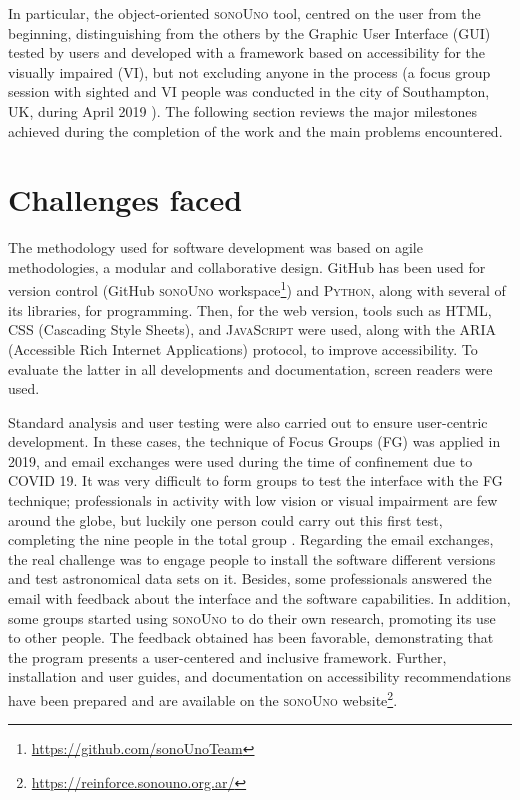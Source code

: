 \documentclass[baaa]{baaa}
\begin{document}
In particular, the object-oriented \textsc{sonoUno} tool, centred on the user from the beginning, distinguishing from the others by the Graphic User Interface (GUI) tested by users and developed with a framework based on accessibility for the visually impaired (VI), but not excluding anyone in the process (a focus group session with sighted and VI people was conducted in the city of Southampton, UK, during April 2019 \citep{casadoFG2022}). The following section reviews the major milestones achieved during the completion of the work and the main problems encountered.

\section{Challenges faced}

The methodology used for software development was based on agile methodologies, a modular and collaborative design. GitHub has been used for version control ({GitHub \textsc{sonoUno} workspace}\footnote[1]{\url{https://github.com/sonoUnoTeam}}) and \textsc{Python}, along with several of its libraries, for programming. Then, for the web version, tools such as \textsc{HTML}, \textsc{CSS} (Cascading Style Sheets), and \textsc{JavaScript} were used, along with the \textsc{ARIA} (Accessible Rich Internet Applications) protocol, to improve accessibility. To evaluate the latter in all developments and documentation, screen readers were used.

Standard analysis and user testing were also carried out to ensure user-centric development. In these cases, the technique of Focus Groups (FG) was applied in 2019, and email exchanges were used during the time of confinement due to COVID 19. It was very difficult to form groups to test the interface with the FG technique; professionals in activity with low vision or visual impairment are few around the globe, but luckily one person could carry out this first test, completing the nine people in the total group \citep{casadoFG2022}. Regarding the email exchanges, the real challenge was to engage people to install the software different versions and test astronomical data sets on it. Besides, some professionals answered the email with feedback about the interface and the software capabilities. In addition, some groups started using \textsc{sonoUno} to do their own research, promoting its use to other people. The feedback obtained has been favorable, demonstrating that the program presents a user-centered and inclusive framework. Further, installation and user guides, and documentation on accessibility recommendations have been prepared and are available on the \textsc{sonoUno} website\footnote[2]{\url{https://reinforce.sonouno.org.ar/}}.
\end{document}
